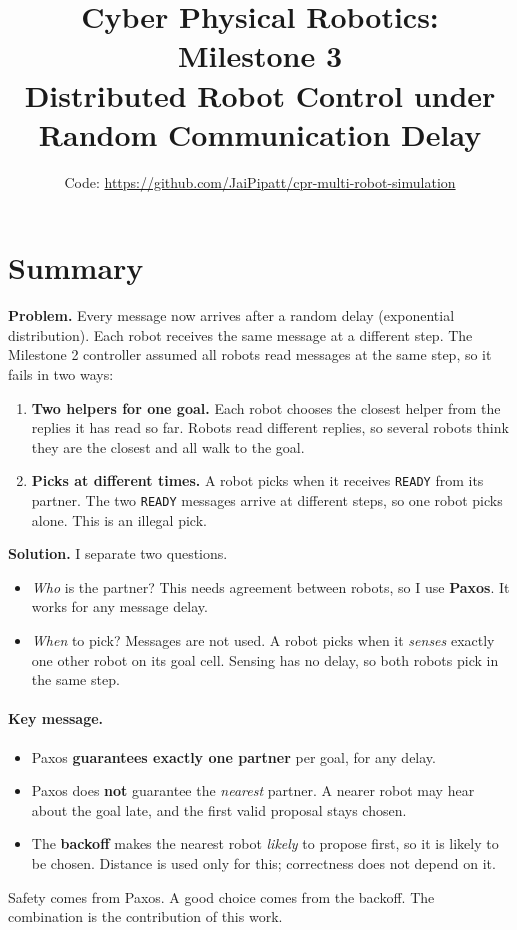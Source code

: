 \documentclass[11pt,a4paper]{article}
\title{Cyber Physical Robotics: Milestone 3\\
       \large Distributed Robot Control under Random Communication Delay}
\author{Code: \url{https://github.com/JaiPipatt/cpr-multi-robot-simulation}}
\date{}
\begin{document}
\maketitle
\vspace{-2.5em}

\section{Summary}
\textbf{Problem.} Every message now arrives after a random delay (exponential
distribution). Each robot receives the same message at a different step. The
Milestone 2 controller assumed all robots read messages at the same step, so it
fails in two ways:
\begin{enumerate}
\item \textbf{Two helpers for one goal.} Each robot chooses the closest helper from
the replies it has read so far. Robots read different replies, so several robots
think they are the closest and all walk to the goal.
\item \textbf{Picks at different times.} A robot picks when it receives
\texttt{READY} from its partner. The two \texttt{READY} messages arrive at
different steps, so one robot picks alone. This is an illegal pick.
\end{enumerate}

\textbf{Solution.} I separate two questions.
\begin{itemize}
\item \emph{Who} is the partner? This needs agreement between robots, so I use
\textbf{Paxos}. It works for any message delay.
\item \emph{When} to pick? Messages are not used. A robot picks when it
\emph{senses} exactly one other robot on its goal cell. Sensing has no delay, so
both robots pick in the same step.
\end{itemize}

\paragraph{Key message.}
\begin{itemize}
\item Paxos \textbf{guarantees exactly one partner} per goal, for any delay.
\item Paxos does \textbf{not} guarantee the \emph{nearest} partner. A nearer robot
may hear about the goal late, and the first valid proposal stays chosen.
\item The \textbf{backoff} makes the nearest robot \emph{likely} to propose first,
so it is likely to be chosen. Distance is used only for this; correctness does not
depend on it.
\end{itemize}
Safety comes from Paxos. A good choice comes from the backoff. The combination is
the contribution of this work.
\end{document}
